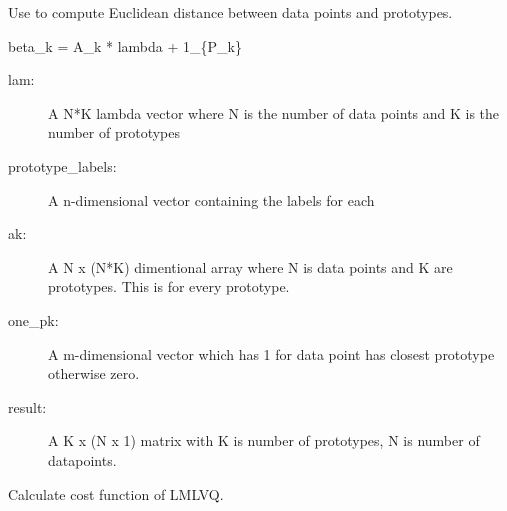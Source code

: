 \documentclass[letterpaper,10pt,english]{sphinxmanual}
\begin{document}
\begin{fulllineitems}
\begin{fulllineitems}
\begin{description}
\end{description}

\end{fulllineitems}


\begin{fulllineitems}
\label{\detokenize{index:lmlvq_distance.LMLVQ.beta_k}}
Use to compute Euclidean distance between data points and prototypes.

beta\_k = A\_k * lambda + 1\_\{P\_k\}
\begin{description}
\item[{lam:}] \leavevmode
A N*K lambda vector where N is the number of data points and K is
the number of prototypes

\item[{prototype\_labels:}] \leavevmode
A n-dimensional vector containing the labels for each

\item[{ak:}] \leavevmode
A N x (N*K) dimentional array where N is data points and K are
prototypes. This is for every prototype.

\item[{one\_pk:}] \leavevmode
A m-dimensional vector which has 1 for data point has
closest prototype otherwise zero.

\end{description}
\begin{description}
\item[{result:}] \leavevmode
A K x (N x 1) matrix with K is number of prototypes, N is number
of datapoints.

\end{description}

\end{fulllineitems}


\begin{fulllineitems}
\label{\detokenize{index:lmlvq_distance.LMLVQ.cost_function}}
Calculate cost function of LMLVQ.


\end{fulllineitems}
\end{fulllineitems}
\end{document}
